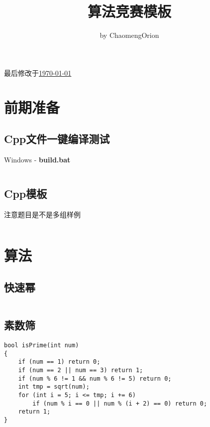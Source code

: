 \documentclass[a4paper, 10pt]{paper}
\newcommand{\cpp}[1]{\inputminted[frame=single, linenos=true]{cpp}{#1}}
\begin{document}
    \title{算法竞赛模板}
    \author{by ChaomengOrion}
    \maketitle
    {\color{cyan}最后修改于\underline{\today}}

    \tableofcontents

    \section{前期准备}
        \subsection{Cpp文件一键编译测试}
        Windows - \textbf{build.bat}
        \inputminted[frame=single, linenos=true]{bat}{../build.bat}

        \subsection{Cpp模板}
        注意题目是不是多组样例
        \cpp{../template.cpp}

    \section{算法}
        \subsection{快速幂}
        \cpp{../快速幂.cpp}

        \subsection{素数筛}
        \begin{verbatim}
bool isPrime(int num)
{
    if (num == 1) return 0;
    if (num == 2 || num == 3) return 1;
    if (num % 6 != 1 && num % 6 != 5) return 0;
    int tmp = sqrt(num);
    for (int i = 5; i <= tmp; i += 6)
        if (num % i == 0 || num % (i + 2) == 0) return 0;
    return 1;
}
        \end{verbatim}
\end{document}
